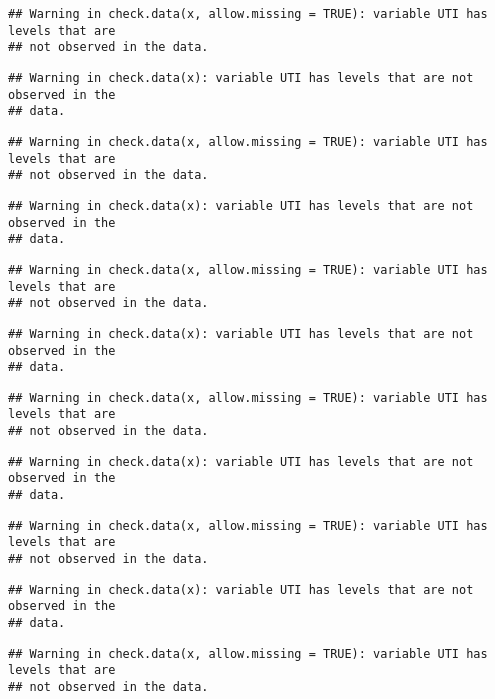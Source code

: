 \documentclass[
]{article}
\begin{document}
\begin{verbatim}
## Warning in check.data(x, allow.missing = TRUE): variable UTI has levels that are
## not observed in the data.
\end{verbatim}

\begin{verbatim}
## Warning in check.data(x): variable UTI has levels that are not observed in the
## data.
\end{verbatim}

\begin{verbatim}
## Warning in check.data(x, allow.missing = TRUE): variable UTI has levels that are
## not observed in the data.
\end{verbatim}

\begin{verbatim}
## Warning in check.data(x): variable UTI has levels that are not observed in the
## data.
\end{verbatim}

\begin{verbatim}
## Warning in check.data(x, allow.missing = TRUE): variable UTI has levels that are
## not observed in the data.
\end{verbatim}

\begin{verbatim}
## Warning in check.data(x): variable UTI has levels that are not observed in the
## data.
\end{verbatim}

\begin{verbatim}
## Warning in check.data(x, allow.missing = TRUE): variable UTI has levels that are
## not observed in the data.
\end{verbatim}

\begin{verbatim}
## Warning in check.data(x): variable UTI has levels that are not observed in the
## data.
\end{verbatim}

\begin{verbatim}
## Warning in check.data(x, allow.missing = TRUE): variable UTI has levels that are
## not observed in the data.
\end{verbatim}

\begin{verbatim}
## Warning in check.data(x): variable UTI has levels that are not observed in the
## data.
\end{verbatim}

\begin{verbatim}
## Warning in check.data(x, allow.missing = TRUE): variable UTI has levels that are
## not observed in the data.
\end{verbatim}
\end{document}
